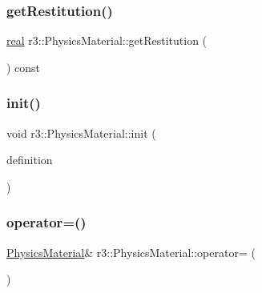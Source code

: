 \mbox{\label{classr3_1_1_physics_material_a555b73c2bde3679b0e40087455eab61e}} 
\subsubsection{\texorpdfstring{get\+Restitution()}{getRestitution()}}
{\footnotesize\ttfamily \mbox{\hyperlink{namespacer3_ab2016b3e3f743fb735afce242f0dc1eb}{real}} r3\+::\+Physics\+Material\+::get\+Restitution (\begin{DoxyParamCaption}{ }\end{DoxyParamCaption}) const}

\mbox{\label{classr3_1_1_physics_material_a13509f5494d00fdd5356ca6101c620ac}} 
\subsubsection{\texorpdfstring{init()}{init()}}
{\footnotesize\ttfamily void r3\+::\+Physics\+Material\+::init (\begin{DoxyParamCaption}\item[{const \mbox{\hyperlink{structr3_1_1_physics_material_def}{Physics\+Material\+Def}} \&}]{definition }\end{DoxyParamCaption})}

\mbox{\label{classr3_1_1_physics_material_a2c2b9752b5d5305ca2189e91fb8979e6}} 
\subsubsection{\texorpdfstring{operator=()}{operator=()}}
{\footnotesize\ttfamily \mbox{\hyperlink{classr3_1_1_physics_material}{Physics\+Material}}\& r3\+::\+Physics\+Material\+::operator= (\begin{DoxyParamCaption}\item[{const \mbox{\hyperlink{classr3_1_1_physics_material}{Physics\+Material}} \&}]{ }\end{DoxyParamCaption})\hspace{0.3cm}{\ttfamily [default]}}

